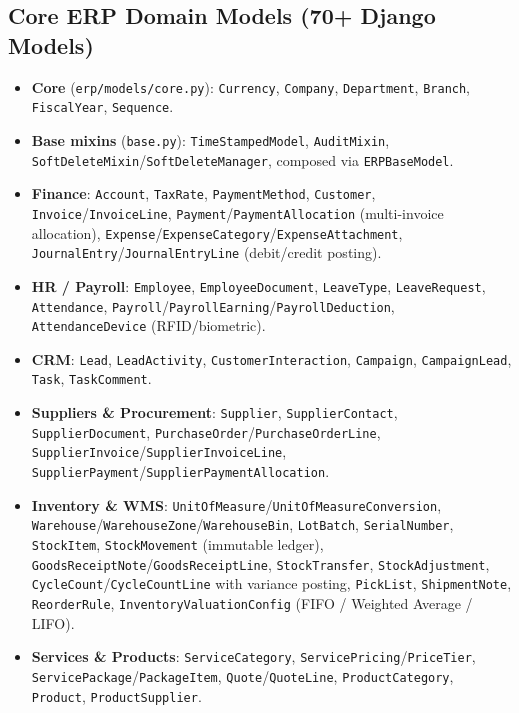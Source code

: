 \documentclass[12pt,a4paper]{report}
\begin{document}
\subsection{Core ERP Domain Models (70+ Django Models)}
\begin{itemize}
  \item \textbf{Core} (\texttt{erp/models/core.py}): \texttt{Currency}, \texttt{Company}, \texttt{Department}, \texttt{Branch}, \texttt{FiscalYear}, \texttt{Sequence}.
  \item \textbf{Base mixins} (\texttt{base.py}): \texttt{TimeStampedModel}, \texttt{AuditMixin}, \texttt{SoftDeleteMixin}/\texttt{SoftDeleteManager}, composed via \texttt{ERPBaseModel}.
  \item \textbf{Finance}: \texttt{Account}, \texttt{TaxRate}, \texttt{PaymentMethod}, \texttt{Customer}, \texttt{Invoice}/\texttt{InvoiceLine}, \texttt{Payment}/\texttt{PaymentAllocation} (multi-invoice allocation), \texttt{Expense}/\texttt{ExpenseCategory}/\texttt{ExpenseAttachment}, \texttt{JournalEntry}/\texttt{JournalEntryLine} (debit/credit posting).
  \item \textbf{HR / Payroll}: \texttt{Employee}, \texttt{EmployeeDocument}, \texttt{LeaveType}, \texttt{LeaveRequest}, \texttt{Attendance}, \texttt{Payroll}/\texttt{PayrollEarning}/\texttt{PayrollDeduction}, \texttt{AttendanceDevice} (RFID/biometric).
  \item \textbf{CRM}: \texttt{Lead}, \texttt{LeadActivity}, \texttt{CustomerInteraction}, \texttt{Campaign}, \texttt{CampaignLead}, \texttt{Task}, \texttt{TaskComment}.
  \item \textbf{Suppliers \& Procurement}: \texttt{Supplier}, \texttt{SupplierContact}, \texttt{SupplierDocument}, \texttt{PurchaseOrder}/\texttt{PurchaseOrderLine}, \texttt{SupplierInvoice}/\texttt{SupplierInvoiceLine}, \texttt{SupplierPayment}/\texttt{SupplierPaymentAllocation}.
  \item \textbf{Inventory \& WMS}: \texttt{UnitOfMeasure}/\texttt{UnitOfMeasureConversion}, \texttt{Warehouse}/\texttt{WarehouseZone}/\texttt{WarehouseBin}, \texttt{LotBatch}, \texttt{SerialNumber}, \texttt{StockItem}, \texttt{StockMovement} (immutable ledger), \texttt{GoodsReceiptNote}/\texttt{GoodsReceiptLine}, \texttt{StockTransfer}, \texttt{StockAdjustment}, \texttt{CycleCount}/\texttt{CycleCountLine} with variance posting, \texttt{PickList}, \texttt{ShipmentNote}, \texttt{ReorderRule}, \texttt{InventoryValuationConfig} (FIFO / Weighted Average / LIFO).
  \item \textbf{Services \& Products}: \texttt{ServiceCategory}, \texttt{ServicePricing}/\texttt{PriceTier}, \texttt{ServicePackage}/\texttt{PackageItem}, \texttt{Quote}/\texttt{QuoteLine}, \texttt{ProductCategory}, \texttt{Product}, \texttt{ProductSupplier}.

\end{itemize}
\end{document}
